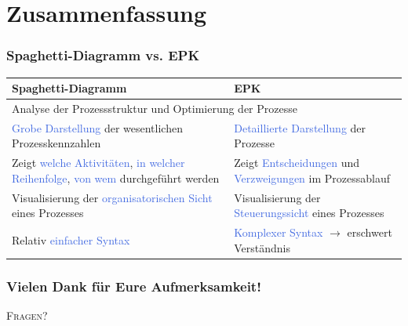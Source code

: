 \documentclass[xcolor=dvipsnames]{beamer}
\begin{document}
\section[Zusammenfassung]{Zusammenfassung}
 \begin{frame}
  \frametitle{Spaghetti-Diagramm vs. EPK}
\small{
\begin{tabularx}{\textwidth}{XX}

\hline
\hline
\textbf{Spaghetti-Diagramm} & \textbf{EPK} \\ 
\hline
\multicolumn{2}{l}{\pause Analyse der Prozessstruktur und Optimierung der Prozesse} \\ \hline
\pause\textcolor{RoyalBlue}{Grobe Darstellung} der wesentlichen Prozesskennzahlen & \pause\textcolor{RoyalBlue}{Detaillierte Darstellung} der Prozesse   \\ 
\hline
\pause Zeigt \textcolor{RoyalBlue}{welche Aktivitäten}, \textcolor{RoyalBlue}{in welcher Reihenfolge}, \textcolor{RoyalBlue}{von wem} durchgeführt werden & \pause Zeigt \textcolor{RoyalBlue}{Entscheidungen}  und \textcolor{RoyalBlue}{Verzweigungen} im Prozessablauf \\
\hline
\pause Visualisierung der \textcolor{RoyalBlue}{organisatorischen Sicht} eines Prozesses & \pause Visualisierung der \textcolor{RoyalBlue}{Steuerungssicht} eines Prozesses \\
\hline
\pause Relativ \textcolor{RoyalBlue}{einfacher Syntax} & \pause \textcolor{RoyalBlue}{Komplexer Syntax} $\rightarrow$ erschwert Verständnis \\
\hline
\hline


\end{tabularx}
}
  
  \end{frame}
  
  
   \begin{frame}
  \frametitle{Vielen Dank für Eure Aufmerksamkeit!}
\begin{center}
  \begin{Huge}
\textsc{Fragen?}
\end{Huge}
  
\end{center}
  \end{frame}
    
\end{document}
